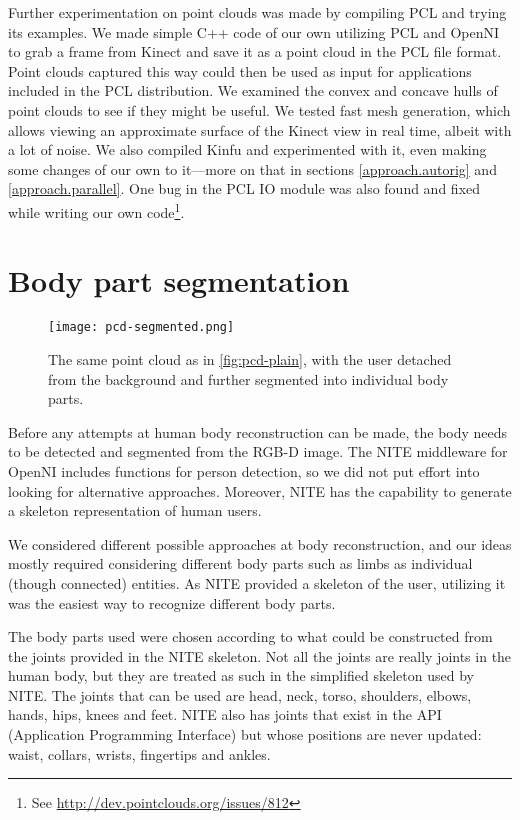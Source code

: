 Further experimentation on point clouds was made by compiling PCL and trying its examples. We made simple C++ code of our own utilizing PCL and OpenNI to grab a frame from Kinect and save it as a point cloud in the PCL file format. Point clouds captured this way could then be used as input for applications included in the PCL distribution. We examined the convex and concave hulls of point clouds to see if they might be useful. We tested fast mesh generation, which allows viewing an approximate surface of the Kinect view in real time, albeit with a lot of noise. We also compiled Kinfu and experimented with it, even making some changes of our own to it---more on that in sections \ref{approach.autorig} and \ref{approach.parallel}. One bug in the PCL IO module was also found and fixed while writing our own code\footnote{See \url{http://dev.pointclouds.org/issues/812}}.


\section{Body part segmentation} \label{approach.segmentation}

\begin{figure}
    \centering
    \texttt{[image: pcd-segmented.png]}
    \caption{The same point cloud as in \ref{fig:pcd-plain}, with the user detached from the background and further segmented into individual body parts.}
    \label{fig:pcd-segmented}
\end{figure}

Before any attempts at human body reconstruction can be made, the body needs to be detected and segmented from the RGB-D image. The NITE middleware for OpenNI \citep{NITE} includes functions for person detection, so we did not put effort into looking for alternative approaches. Moreover, NITE has the capability to generate a skeleton representation of human users.

We considered different possible approaches at body reconstruction, and our ideas mostly required considering different body parts such as limbs as individual (though connected) entities. As NITE provided a skeleton of the user, utilizing it was the easiest way to recognize different body parts.

The body parts used were chosen according to what could be constructed from the joints provided in the NITE skeleton. Not all the joints are really joints in the human body, but they are treated as such in the simplified skeleton used by NITE. The joints that can be used are head, neck, torso, shoulders, elbows, hands, hips, knees and feet. NITE also has joints that exist in the API (Application Programming Interface) but whose positions are never updated: waist, collars, wrists, fingertips and ankles. 

